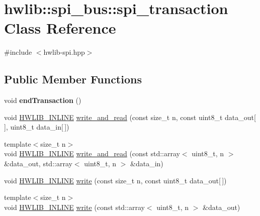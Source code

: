 \hypertarget{classhwlib_1_1spi__bus_1_1spi__transaction}{}\section{hwlib\+:\+:spi\+\_\+bus\+:\+:spi\+\_\+transaction Class Reference}
\label{classhwlib_1_1spi__bus_1_1spi__transaction}


{\ttfamily \#include $<$hwlib-\/spi.\+hpp$>$}

\subsection*{Public Member Functions}
\begin{DoxyCompactItemize}
\item 
\mbox{\label{classhwlib_1_1spi__bus_1_1spi__transaction_a7f88f6495a59e3f33ae1439f96efd579}} 
void {\bfseries end\+Transaction} ()
\item 
void \hyperlink{hwlib-defines_8hpp_a520a8905adc71f1757aea4ce05183585}{H\+W\+L\+I\+B\+\_\+\+I\+N\+L\+I\+NE} \hyperlink{classhwlib_1_1spi__bus_1_1spi__transaction_a4ee28fb69390f3e7bd6f70288e602227}{write\+\_\+and\+\_\+read} (const size\+\_\+t n, const uint8\+\_\+t data\+\_\+out\mbox{[}$\,$\mbox{]}, uint8\+\_\+t data\+\_\+in\mbox{[}$\,$\mbox{]})
\item 
{\footnotesize template$<$size\+\_\+t n$>$ }\\void \hyperlink{hwlib-defines_8hpp_a520a8905adc71f1757aea4ce05183585}{H\+W\+L\+I\+B\+\_\+\+I\+N\+L\+I\+NE} \hyperlink{classhwlib_1_1spi__bus_1_1spi__transaction_ac80ff882385930ec4a85952a4a17f89e}{write\+\_\+and\+\_\+read} (const std\+::array$<$ uint8\+\_\+t, n $>$ \&data\+\_\+out, std\+::array$<$ uint8\+\_\+t, n $>$ \&data\+\_\+in)
\item 
void \hyperlink{hwlib-defines_8hpp_a520a8905adc71f1757aea4ce05183585}{H\+W\+L\+I\+B\+\_\+\+I\+N\+L\+I\+NE} \hyperlink{classhwlib_1_1spi__bus_1_1spi__transaction_a53219b4fcfef256728024ef010c71bb8}{write} (const size\+\_\+t n, const uint8\+\_\+t data\+\_\+out\mbox{[}$\,$\mbox{]})
\item 
{\footnotesize template$<$size\+\_\+t n$>$ }\\void \hyperlink{hwlib-defines_8hpp_a520a8905adc71f1757aea4ce05183585}{H\+W\+L\+I\+B\+\_\+\+I\+N\+L\+I\+NE} \hyperlink{classhwlib_1_1spi__bus_1_1spi__transaction_a2a877f3b53b777630f7ac1fe0dde4b43}{write} (const std\+::array$<$ uint8\+\_\+t, n $>$ \&data\+\_\+out)

\end{DoxyCompactItemize}
